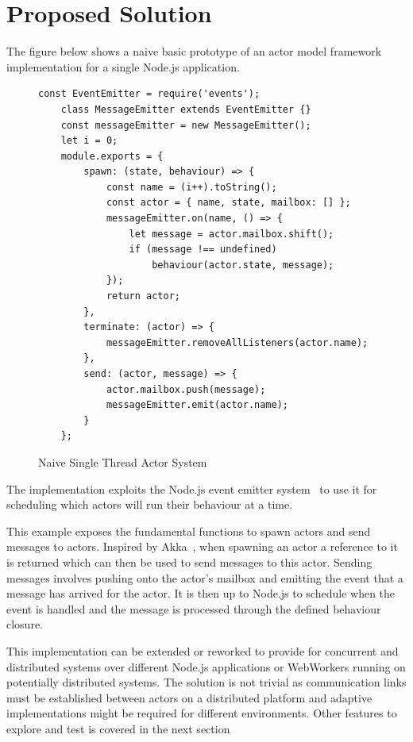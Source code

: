 \documentclass[12pt]{report}
\begin{document}
\section{Proposed Solution}
The figure below shows a naive basic prototype of an actor model framework implementation for a single Node.js application.
\begin{figure}[H]
  \begin{lstlisting}[gobble=2]
    const EventEmitter = require('events');
    class MessageEmitter extends EventEmitter {}
    const messageEmitter = new MessageEmitter();
    let i = 0;
    module.exports = {
        spawn: (state, behaviour) => {
            const name = (i++).toString();
            const actor = { name, state, mailbox: [] };
            messageEmitter.on(name, () => {
                let message = actor.mailbox.shift();
                if (message !== undefined)
                    behaviour(actor.state, message);
            });
            return actor;
        },
        terminate: (actor) => {
            messageEmitter.removeAllListeners(actor.name);
        },
        send: (actor, message) => {
            actor.mailbox.push(message);
            messageEmitter.emit(actor.name);
        }
    };
  \end{lstlisting}
  \caption{Naive Single Thread Actor System}
\end{figure}
The implementation exploits the Node.js event emitter system~\cite{nodeevents} to use it for scheduling which actors will run their behaviour at a time.

This example exposes the fundamental functions to spawn actors and send messages to actors. Inspired by Akka~\cite{stivan2015akka}, when spawning an actor a reference to it is returned which can then be used to send messages to this actor. Sending messages involves pushing onto the actor's mailbox and emitting the event that a message has arrived for the actor. It is then up to Node.js to schedule when the event is handled and the message is processed through the defined behaviour closure.

This implementation can be extended or reworked to provide for concurrent and distributed systems over different Node.js applications or WebWorkers running on potentially distributed systems. The solution is not trivial as communication links must be established between actors on a distributed platform and adaptive implementations might be required for different environments. Other features to explore and test is covered in the next section
\newpage
\end{document}
